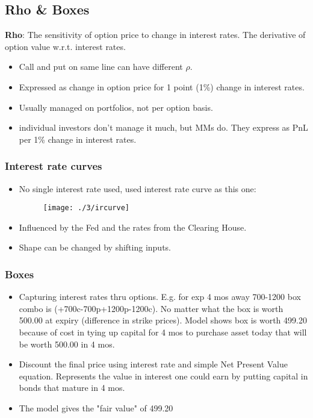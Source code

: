 \documentclass{article}
\begin{document}
\subsection*{Rho \& Boxes}
\textbf{Rho}: The sensitivity of option price to change in interest rates. 
The derivative of option value w.r.t. interest rates.
\begin{itemize}
    \item Call and put on same line can have different $\rho$.
    \item Expressed as change in option price for 1 point (1\%) change in
    interest rates.
    \item Usually managed on portfolios, not per option basis.
    \item individual investors don't manage it much, but MMs do. They express as
    PnL per 1\% change in interest rates.
\end{itemize}
\newpage
\subsubsection{Interest rate curves}
\begin{itemize}
    \item No single interest rate used, used interest rate curve as this one:
    \begin{figure}[h]
        \texttt{[image: ./3/ircurve]}
        \centering
    \end{figure}
    \item Influenced by the Fed and the rates from the Clearing House.
    \item Shape can be changed by shifting inputs.
\end{itemize}

\subsubsection{Boxes}
\begin{itemize}
    \item Capturing interest rates thru options. E.g. for exp 4 mos away
    700-1200 box combo is (+700c-700p+1200p-1200c). No matter what the box is
    worth 500.00 at expiry (difference in strike prices). Model shows box is
    worth 499.20 because of cost in tying up capital for 4 mos to purchase asset
    today that will be worth 500.00 in 4 mos.
    \item Discount the final price using interest rate and simple Net Present
    Value equation. Represents the value in interest one could earn by putting
    capital in bonds that mature in 4 mos.
    \item The model gives the "fair value" of 499.20
\end{itemize}
\end{document}
